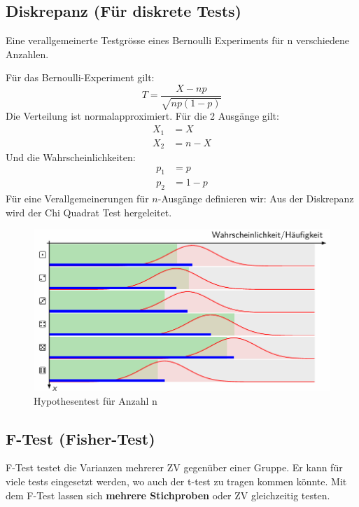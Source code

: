 \documentclass[../Main.tex]{subfiles}
\begin{document}
\subsection{Diskrepanz (Für diskrete Tests)}
Eine verallgemeinerte Testgrösse eines Bernoulli Experiments für
n verschiedene Anzahlen.

Für das Bernoulli-Experiment gilt:
\begin{equation*}
    T = \frac{X-np}{\sqrt{np(1-p)}}
\end{equation*}
Die Verteilung ist normalapproximiert. Für die 2 Ausgänge gilt:
\begin{equation*}
    \begin{split}
        X_1 &= X \\
        X_2 &= n-X
    \end{split}
\end{equation*}
Und die Wahrscheinlichkeiten:
\begin{equation*}
    \begin{split}
        p_1 &= p \\
        p_2 &= 1-p
    \end{split}
\end{equation*}
Für eine Verallgemeinerungen für \(n\)-Ausgänge definieren wir:
Aus der Diskrepanz wird der Chi Quadrat Test hergeleitet.

\begin{figure}[H]
    \centering
    \includegraphics[width=0.75\linewidth]{Images/hyp-n-anzahl.png}
    \caption{Hypothesentest für Anzahl n}
\end{figure}

\subsection{F-Test (Fisher-Test)}
F-Test testet die Varianzen mehrerer ZV gegenüber einer Gruppe.
Er kann für viele tests eingesetzt werden, wo auch der t-test zu tragen kommen könnte.
Mit dem F-Test lassen sich \textbf{mehrere Stichproben} oder ZV gleichzeitig testen.
\end{document}
